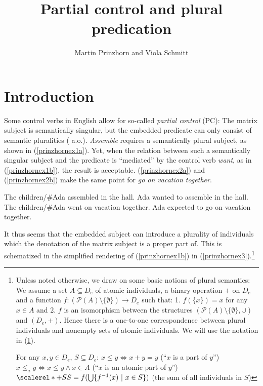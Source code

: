 \documentclass[output=paper]{langscibook}
\author{Martin Prinzhorn\affiliation{University of Vienna} and Viola Schmitt\orcid{}\affiliation{Humboldt-Universität zu Berlin}}
\title{Partial control and plural predication}
\begin{document}
\maketitle

\section{Introduction}\label{prinzhornsec:1}

Some control verbs in English allow for so-called  \textit{partial control} (PC): The matrix subject is semantically singular, but the embedded predicate can only consist of semantic pluralities (\cite{Wilkinson:1971, Landau:2000, wurmbrand01b, Wurmbrand:2002, Pearson:2016} a.o.). \textit{Assemble} requires a semantically plural subject, as shown in (\ref{prinzhornex1a}). Yet, when the relation between such a semantically singular subject and the predicate is “mediated” by the control verb \textit{want}, as in (\ref{prinzhornex1b}), the result is acceptable. (\ref{prinzhornex2a}) and (\ref{prinzhornex2b}) make the same point for \textit{go on vacation together}.

\ea  
\ea The children\slash\#Ada assembled in the hall. \label{prinzhornex1a}
\ex	Ada wanted to assemble in the hall. \hfill \citep[(1a)]{Pearson:2016} \label{prinzhornex1b}
\ex The children\slash\#Ada went on vacation together. \label{prinzhornex2a}
\ex Ada expected to go on vacation together. \hfill \citep[(1b)]{Pearson:2016} \label{prinzhornex2b}
\z\z
	
It thus seems that the embedded subject can introduce a plurality of individuals which the denotation of the matrix subject is a proper part of. This is schematized in the simplified rendering of (\ref{prinzhornex1b}) in (\ref{prinzhornex3}).\footnote{Unless noted otherwise, we draw on some basic notions of plural semantics: We assume a set $A \subseteq D_e$ of atomic individuals, a binary operation $+$ on $D_e$ and a function $f\colon (\mathcal{P}(A)\setminus \{\emptyset\}) \to D_e$ such that: 1. $f(\{x\}) = x$ for any $x \in A$ and 2. $f$ is an isomorphism between the structures $(\mathcal{P}(A)\setminus \{\emptyset\}, \cup)$ and $(D_e, +)$. Hence there is a one-to-one correspondence between plural individuals and nonempty sets of atomic individuals. We will use the notation in (\ref{prinzhornDD}).

\ea \label{prinzhornDD} For any $x, y \in D_e$, $S \subseteq D_e$:
\ea $x \leq y \Leftrightarrow x + y = y$ (``$x$ is a part of $y$'')
 \ex $x \leq_{a} y \Leftrightarrow x \leq y \land x \in A$ (``$x$ is an atomic part of $y$'')
\ex  $\scalerel*{+}{S}S = f(\bigcup\{f^{-1}(x)\ |\ x \in S\})$ (the sum of all individuals in $S$)
\z\z}
\end{document}
